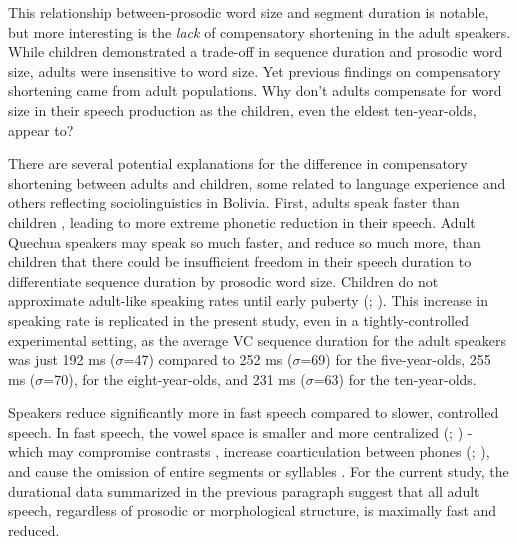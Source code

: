 \documentclass[a4paper,man,floatsintext,natbib,donotrepeattitle, apacite]{apa6}
\begin{document}
This relationship between-prosodic word size and segment duration is notable, but more interesting is the \textit{lack} of compensatory shortening in the adult speakers. While children demonstrated a trade-off in sequence duration and prosodic word size, adults were insensitive to word size. Yet previous findings on compensatory shortening came from adult populations. Why don't adults compensate for word size in their speech production as the children, even the eldest ten-year-olds, appear to?

There are several potential explanations for the difference in compensatory shortening between adults and children, some related to language experience and others reflecting sociolinguistics in Bolivia. First, adults speak faster than children \citep{leeAcousticsChildrenSpeech1999}, leading to more extreme phonetic reduction in their speech. Adult Quechua speakers may speak so much faster, and reduce so much more, than children that there could be insufficient freedom in their speech duration to differentiate sequence duration by prosodic word size. Children do not approximate adult-like speaking rates until early puberty (\citealt{leeAcousticsChildrenSpeech1999}; \citealt{smithRelationshipsDurationTemporal1992}). This increase in speaking rate is replicated in the present study, even in a tightly-controlled experimental setting, as the average VC sequence duration for the adult speakers was just 192 ms ($\sigma$=47) compared to 252 ms ($\sigma$=69) for the five-year-olds, 255 ms ($\sigma$=70), for the eight-year-olds, and 231 ms ($\sigma$=63) for the ten-year-olds. 

Speakers reduce significantly more in fast speech compared to slower, controlled speech. In fast speech, the vowel space is smaller and more centralized (\citealt{fourakisTempoStressVowel1991}; \citealt{tsaoEffectIntertalkerSpeech2006}) - which may compromise contrasts \citep{koopmans-vanbeinumVowelContrastReduction1980}, increase coarticulation between phones (\citealt{agwueleEffectSpeakingRate2008}; \citealt{matthiesVariationAnticipatoryCoarticulation2001}), and cause the omission of entire segments or syllables \citep{johnsonMassiveReductionConversational2004}. For the current study, the durational data summarized in the previous paragraph suggest that all adult speech, regardless of prosodic or morphological structure, is maximally fast and reduced.  
\end{document}
